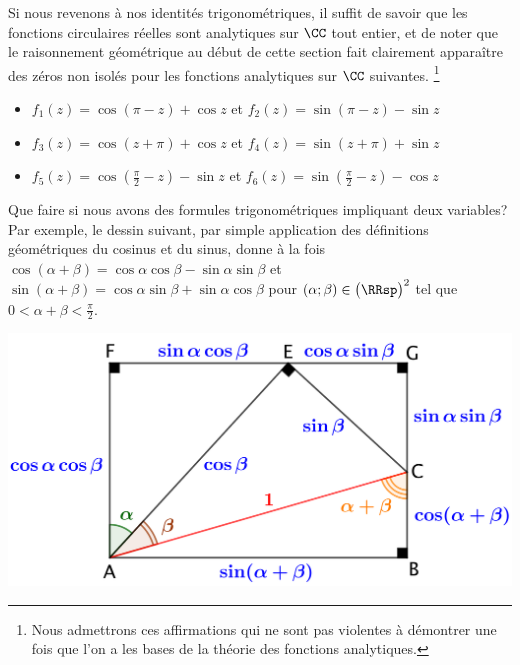 Si nous revenons à nos identités trigonométriques, il suffit de savoir que les fonctions circulaires réelles sont analytiques sur $\CC$ tout entier, et de noter que le raisonnement géométrique au début de cette section fait clairement apparaître des zéros non isolés pour les fonctions analytiques sur $\CC$ suivantes.%
\footnote{
	Nous admettrons ces affirmations qui ne sont pas violentes à démontrer une fois que l'on a les bases de la théorie des fonctions analytiques.
}
%
\begin{itemize}[label=\small\textbullet]
	\item $f_1(z) = \cos (\pi - z) + \cos z$ 
	   et $f_2(z) = \sin (\pi - z) - \sin z$ 

	\smallskip
	\item $f_3(z) =\cos (z + \pi) + \cos z$ 
	   et $f_4(z) =\sin (z + \pi) + \sin z$

	\smallskip
	\item $f_5(z) =\cos \left( \frac{\pi}{2} - z \right) - \sin z$ 
	   et $f_6(z) =\sin \left( \frac{\pi}{2} - z \right) - \cos z$ 
\end{itemize}








\newpage


Que faire si nous avons des formules trigonométriques impliquant deux variables? Par exemple, le dessin suivant, par simple application des définitions géométriques du cosinus et du sinus, donne à la fois
$\cos(\alpha + \beta) = \cos \alpha \cos \beta - \sin \alpha \sin \beta$
et
$\sin(\alpha + \beta) = \cos \alpha \sin \beta + \sin \alpha \cos \beta$
pour
$(\alpha ; \beta) \in \big( \RRsp \big)^2$ tel que $0 < \alpha + \beta < \frac{\pi}{2}$. 

\begin{center}
	\includegraphics[scale=.7]{two-var-trig-formulas.png}
\end{center}


